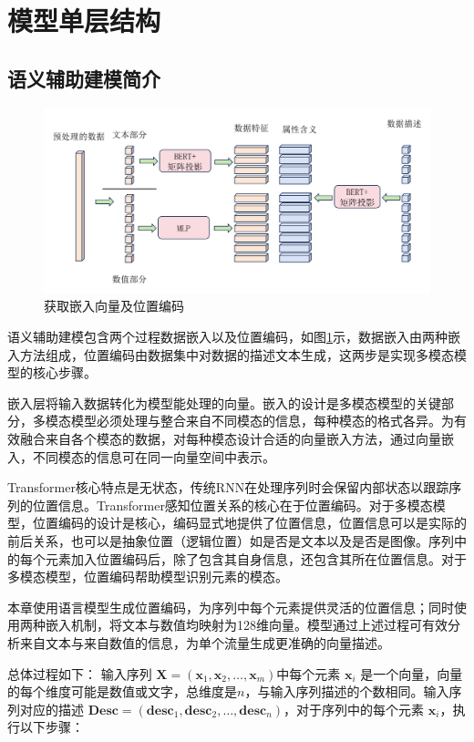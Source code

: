 \section{模型单层结构}

\subsection{语义辅助建模简介}
\begin{figure}[htbp]
    \centering
    \includegraphics[width=\textwidth,height=\textheight,keepaspectratio]{img/multimodal/data2vec.pdf}
    \caption{获取嵌入向量及位置编码}
    \label{fig:data2vec}
\end{figure}

语义辅助建模包含两个过程数据嵌入以及位置编码，如图\ref{fig:data2vec}示，数据嵌入由两种嵌入方法组成，位置编码由数据集中对数据的描述文本生成，这两步是实现多模态模型的核心步骤。

嵌入层将输入数据转化为模型能处理的向量。嵌入的设计是多模态模型的关键部分，多模态模型必须处理与整合来自不同模态的信息，每种模态的格式各异。为有效融合来自各个模态的数据，对每种模态设计合适的向量嵌入方法，通过向量嵌入，不同模态的信息可在同一向量空间中表示。

Transformer核心特点是无状态，传统RNN在处理序列时会保留内部状态以跟踪序列的位置信息。Transformer感知位置关系的核心在于位置编码。对于多模态模型，位置编码的设计是核心，编码显式地提供了位置信息，位置信息可以是实际的前后关系，也可以是抽象位置（逻辑位置）如是否是文本以及是否是图像。序列中的每个元素加入位置编码后，除了包含其自身信息，还包含其所在位置信息。对于多模态模型，位置编码帮助模型识别元素的模态。

本章使用语言模型生成位置编码，为序列中每个元素提供灵活的位置信息；同时使用两种嵌入机制，将文本与数值均映射为128维向量。模型通过上述过程可有效分析来自文本与来自数值的信息，为单个流量生成更准确的向量描述。

总体过程如下：
输入序列 $ \mathbf{X} = (\mathbf{x}_1, \mathbf{x}_2, \ldots, \mathbf{x}_m) $中每个元素 $\mathbf{x}_i$ 是一个向量，向量的每个维度可能是数值或文字，总维度是$n$，与输入序列描述的个数相同。输入序列对应的描述 $ \mathbf{Desc} = (\mathbf{desc}_1, \mathbf{desc}_2, \ldots, \mathbf{desc}_n) $，对于序列中的每个元素 $\mathbf{x}_i$，执行以下步骤：

